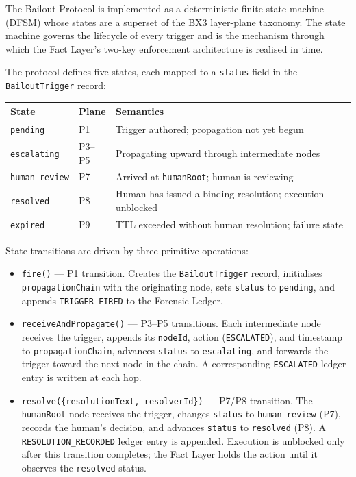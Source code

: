 The Bailout Protocol is implemented as a deterministic finite state machine
(DFSM) whose states are a superset of the BX3 layer-plane taxonomy.
The state machine governs the lifecycle of every trigger and is the mechanism
through which the Fact Layer's two-key enforcement architecture is realised
in time.

The protocol defines five states, each mapped to a \texttt{status} field in
the \texttt{BailoutTrigger} record:

\bigskip
\noindent
\begin{tabular}{llp{8cm}}
  \hline
  \textbf{State} & \textbf{Plane} & \textbf{Semantics} \\
  \hline
  \texttt{pending}       & P1 & Trigger authored; propagation not yet begun \\
  \texttt{escalating}   & P3--P5 & Propagating upward through intermediate nodes \\
  \texttt{human\_review} & P7 & Arrived at \texttt{humanRoot}; human is reviewing \\
  \texttt{resolved}     & P8 & Human has issued a binding resolution; execution unblocked \\
  \texttt{expired}      & P9 & TTL exceeded without human resolution; failure state \\
  \hline
\end{tabular}
\bigskip

State transitions are driven by three primitive operations:

\begin{itemize}
  \item \texttt{fire()} --- P1 transition.  Creates the \texttt{BailoutTrigger}
        record, initialises \texttt{propagationChain} with the originating node,
        sets \texttt{status} to \texttt{pending}, and appends \texttt{TRIGGER\_FIRED}
        to the Forensic Ledger.

  \item \texttt{receiveAndPropagate()} --- P3--P5 transitions.  Each intermediate
        node receives the trigger, appends its \texttt{nodeId}, action
        (\texttt{ESCALATED}), and timestamp to \texttt{propagationChain}, advances
        \texttt{status} to \texttt{escalating}, and forwards the trigger toward the
        next node in the chain.  A corresponding \texttt{ESCALATED} ledger entry
        is written at each hop.

  \item \texttt{resolve(\{resolutionText, resolverId\})} --- P7/P8 transition.
        The \texttt{humanRoot} node receives the trigger, changes \texttt{status}
        to \texttt{human\_review} (P7), records the human's decision, and advances
        \texttt{status} to \texttt{resolved} (P8).  A \texttt{RESOLUTION\_RECORDED}
        ledger entry is appended.  Execution is unblocked only after this
        transition completes; the Fact Layer holds the action until it observes
        the \texttt{resolved} status.
\end{itemize}

